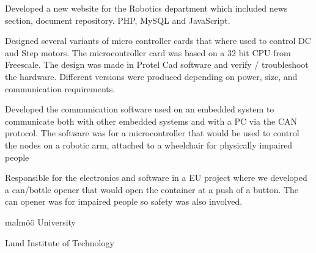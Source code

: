 \documentclass{article}
\begin{document}
  {Developed a new website for the Robotics department which included news
    section, document repository.  PHP, MySQL and JavaScript.} 
\sepspace

{Designed several variants of micro controller cards that where used to control
  DC and Step motors. The microcontroller card was based on a 32 bit CPU from
  Freescale. The design was made in Protel Cad software and verify /
  troubleshoot the hardware. Different versions were produced depending
  on power, size, and communication requirements.
}
\sepspace

{Developed the communication software used on an embedded system to communicate
  both with other  embedded systems and with a PC via the CAN protocol.
  The software was for a microcontroller that would be used to control the
  nodes on a robotic arm, attached to a wheelchair for physically impaired
  people} 
\sepspace

{Responsible for the electronics and software in a EU project where we
  developed a can/bottle opener that would open the container at a push of a
  button. The can opener was for impaired people so safety was also involved.}



{}	
\sepspace

{}	
\sepspace

{}	
\sepspace

{malm\"{o}ö University}
{}
\sepspace

{}	
\sepspace

{Lund Institute of Technology} {}
\end{document}
